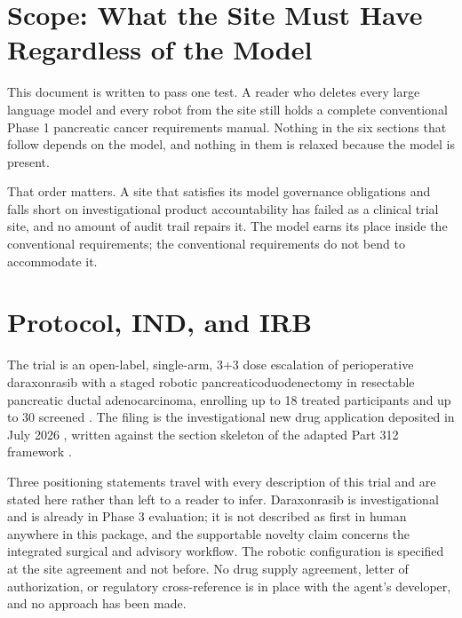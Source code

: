 
\section{Scope: What the Site Must Have Regardless of the Model}

This document is written to pass one test. A reader who deletes every large
language model and every robot from the site still holds a complete conventional
Phase 1 pancreatic cancer requirements manual. Nothing in the six sections that
follow depends on the model, and nothing in them is relaxed because the model is
present.

That order matters. A site that satisfies its model governance obligations and
falls short on investigational product accountability has failed as a clinical
trial site, and no amount of audit trail repairs it. The model earns its place
inside the conventional requirements; the conventional requirements do not bend
to accommodate it.

\section{Protocol, IND, and IRB}

The trial is an open-label, single-arm, 3+3 dose escalation of perioperative
daraxonrasib with a staged robotic pancreaticoduodenectomy in resectable
pancreatic ductal adenocarcinoma, enrolling up to 18 treated participants and up
to 30 screened \cite{phase1protocol}. The filing is the investigational new drug
application deposited in July 2026 \cite{indapp}, written against the section
skeleton of the adapted Part 312 framework \cite{cfr312adapt,cfr312}.

Three positioning statements travel with every description of this trial and are
stated here rather than left to a reader to infer. Daraxonrasib is
investigational and is already in Phase 3 evaluation; it is not described as
first in human anywhere in this package, and the supportable novelty claim
concerns the integrated surgical and advisory workflow. The robotic
configuration is specified at the site agreement and not before. No drug supply
agreement, letter of authorization, or regulatory cross-reference is in place
with the agent's developer, and no approach has been made.

